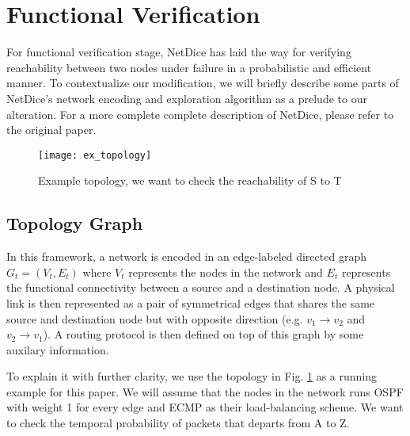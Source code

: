 \section{Functional Verification} \label{sec:functional}
For functional verification stage, NetDice \cite{netdice} 
has laid the way for verifying reachability between two nodes under failure in a 
probabilistic and efficient manner.
To contextualize our modification, we will briefly describe some parts of 
NetDice's network encoding and exploration algorithm as a prelude to our alteration.
For a more complete complete description of NetDice, please refer to the original 
paper.

\begin{figure}[h]
    \centering
    \texttt{[image: ex\_topology]}
    \caption{Example topology, we want to check the reachability of S to T}
    \label{fig:ex}
\end{figure}

\subsection{Topology Graph}
In this framework, a network is encoded in an edge-labeled directed graph 
$G_t = (V_t, E_t)$ where $V_t$ represents the nodes in the network and 
$E_t$ represents the functional connectivity between a source and a destination node. 
A physical link is then represented as a pair of symmetrical edges that shares the same source 
and destination node but with opposite direction (e.g. $v_1 \rightarrow v_2$ and $v_2 
\rightarrow v_1$).
A routing protocol is then defined on top of this graph by some auxilary information.

To explain it with further clarity, we use the topology in Fig. \ref{fig:ex} as a 
running example for this paper. 
We will assume that the nodes in the network runs OSPF with weight 1 for every edge and ECMP 
as their load-balancing scheme.
We want to check the temporal probability of packets that departs from A to Z.


